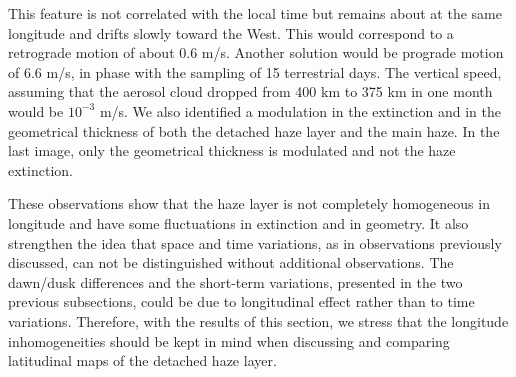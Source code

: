 This feature is not correlated with the local time but remains about at the same longitude and drifts slowly
toward the West. This would correspond to a retrograde motion of about 0.6 m/s. Another solution would be
prograde motion of 6.6 m/s, in phase with the sampling of 15 terrestrial days. The vertical speed, assuming
that the aerosol cloud dropped from 400 km to 375 km in one month would be $10^{-3}$ m/s. We also identified a
modulation in the extinction and in the geometrical thickness of both the detached haze layer and the main
haze. In the last image, only the geometrical thickness is modulated and not the haze extinction.

These observations show that the haze layer is not completely homogeneous in longitude and have some
fluctuations in extinction and in geometry.
It also strengthen the idea that space and time variations, as in observations previously discussed,
can not be distinguished without additional observations. The dawn/dusk differences and the short-term variations,
presented in the two previous subsections, could be due to longitudinal effect rather than to time variations.
Therefore, with the results of this section, we stress that the longitude inhomogeneities should be kept
in mind when discussing and comparing latitudinal maps of the detached haze layer.